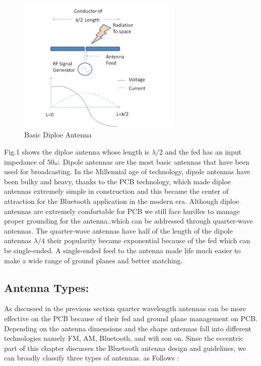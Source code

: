 \begin{figure}[h]
	\centering
	\includegraphics[width=0.7\textwidth]{Chap03/Figures/Basic_Antenna.PNG}
	\caption{Basic Diploe Antenna}
	\label{BASIC_ANTENNA}
\end{figure}

Fig.1  shows the diploe antenna whose length is  $\lambda/2$ and the fed has an input impedance of $50\omega$.
Dipole antennas are the most basic antennas that have been used for broadcasting.
In the Millennial age of technology, dipole antennas have been bulky and heavy, thanks to the PCB technology, which made diploe antennas extremely simple in construction and this became the center of attraction for the Bluetooth application in the modern era.
Although diploe antennas are extremely comfortable for PCB we still face hurdles to manage proper grounding for the antenna..which can be addressed through quarter-wave antennas.
The quarter-wave antennas have half of the length of the dipole antennas  $\lambda/4$ their popularity became exponential because of the fed which can be single-ended.
A single-ended feed to the antenna made life much easier to make a wide range of ground planes and better matching.

\subsection{Antenna Types:}

As discussed in the previous section quarter wavelength antennas can be more effective on the PCB because of their fed and ground plane management on PCB.
Depending on the antenna dimensions and the shape antennas fall into different technologies namely FM, AM, Bluetooth, and wifi son on.
Since the eccentric part of this chapter discusses the Bluetooth antenna design and guidelines, we can broadly classify three types of antennas. as Follows :

